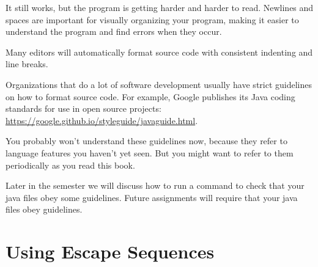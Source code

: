 It still works, but the program is getting harder and harder to read.
Newlines and spaces are important for visually organizing your program, making it easier to understand the program and find errors when they occur.

Many editors will automatically format source code with consistent indenting and line breaks.


%



Organizations that do a lot of software development usually have strict guidelines on how to format source code.
For example, Google publishes its Java coding standards for use in open source projects: \url{https://google.github.io/styleguide/javaguide.html}.

You probably won't understand these guidelines now, because they refer to language features you haven't yet seen.
But you might want to refer to them periodically as you read this book.


Later in the semester we will discuss how to run a command to check that your 
java files obey some guidelines. Future assignments will require that your java files
obey guidelines.

\section{Using Escape Sequences}


